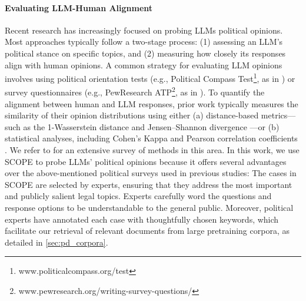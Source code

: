 




\paragraph{Evaluating LLM-Human Alignment}
Recent research has increasingly focused on probing LLMs political opinions. Most approaches typically follow a two-stage process: (1) assessing an LLM's political stance on specific topics, and (2) measuring how closely its responses align with human opinions.
A common strategy for evaluating LLM opinions involves using political orientation tests (e.g., Political Compass Test\footnote{www.politicalcompass.org/test}, as in \citealt{rottger-etal-2024-political,feng-etal-2023-pretraining}) or survey questionnaires (e.g., PewResearch ATP\footnote{www.pewresearch.org/writing-survey-questions/}, as in \citealt{santurkar2023whose}). To quantify the alignment between human and LLM responses, prior work typically measures the similarity of their opinion distributions using either (a) distance-based metrics—such as the 1-Wasserstein distance \cite{santurkar2023whose,sanders2023demonstrations} and Jensen–Shannon divergence \cite{durmus2024towards}—or (b) statistical analyses, including Cohen's Kappa \cite{Argyle_Busby_Fulda_Gubler_Rytting_Wingate_2023,hwang-etal-2023-aligning} and Pearson correlation coefficients \cite{movva-etal-2024-annotation}. 
We refer to \citealt{ma-etal-2024-potential} for an extensive survey of methods in this area. In this work, we use SCOPE to probe LLMs' political opinions because it offers several advantages over the above-mentioned political surveys used in previous studies: The cases in SCOPE are selected by experts, ensuring that they address the most important and publicly salient legal topics. Experts carefully word the questions and response options to be understandable to the general public. Moreover, political experts have annotated each case with thoughtfully chosen keywords, which facilitate our retrieval of relevant documents from large pretraining corpora, as detailed in \autoref{sec:pd_corpora}.
